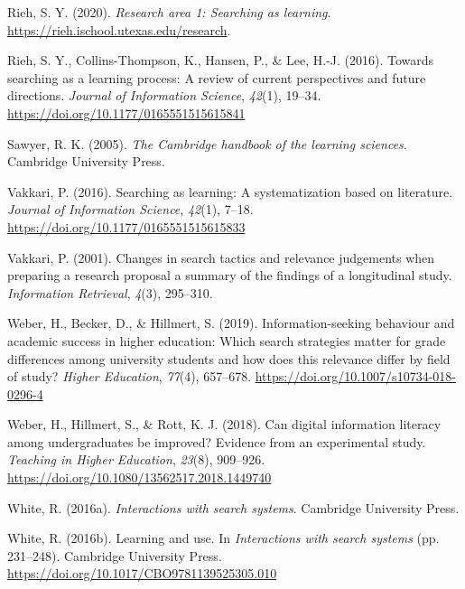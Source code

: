 \documentclass[a4paper, nobind]{templates/ociamthesis}
\newlength{\cslhangindent}
\newenvironment{CSLReferences}[2] %
 {%
  \setlength{\parindent}{0pt}
  \ifodd #1
  \let\oldpar\par
  \def\par{\hangindent=\cslhangindent\oldpar}
  \fi
  \setlength{\parskip}{1mm}
  \setlength{\baselineskip}{6mm}
 }%
 {}
\begin{document}
\begin{CSLReferences}{1}{0}
\leavevmode{}%
Rieh, S. Y. (2020). \emph{Research area 1: Searching as learning}. \url{https://rieh.ischool.utexas.edu/research}.

\leavevmode{}%
Rieh, S. Y., Collins-Thompson, K., Hansen, P., \& Lee, H.-J. (2016). Towards searching as a learning process: A review of current perspectives and future directions. \emph{Journal of Information Science}, \emph{42}(1), 19--34. \url{https://doi.org/10.1177/0165551515615841}

\leavevmode{}%
Sawyer, R. K. (2005). \emph{The {Cambridge} handbook of the learning sciences}. {Cambridge University Press}.

\leavevmode{}%
Vakkari, P. (2016). Searching as learning: A systematization based on literature. \emph{Journal of Information Science}, \emph{42}(1), 7--18. \url{https://doi.org/10.1177/0165551515615833}

\leavevmode{}%
Vakkari, P. (2001). Changes in search tactics and relevance judgements when preparing a research proposal a summary of the findings of a longitudinal study. \emph{Information Retrieval}, \emph{4}(3), 295--310.

\leavevmode{}%
Weber, H., Becker, D., \& Hillmert, S. (2019). Information-seeking behaviour and academic success in higher education: Which search strategies matter for grade differences among university students and how does this relevance differ by field of study? \emph{Higher Education}, \emph{77}(4), 657--678. \url{https://doi.org/10.1007/s10734-018-0296-4}

\leavevmode{}%
Weber, H., Hillmert, S., \& Rott, K. J. (2018). Can digital information literacy among undergraduates be improved? Evidence from an experimental study. \emph{Teaching in Higher Education}, \emph{23}(8), 909--926. \url{https://doi.org/10.1080/13562517.2018.1449740}

\leavevmode{}%
White, R. (2016a). \emph{Interactions with search systems}. Cambridge University Press.

\leavevmode{}%
White, R. (2016b). Learning and use. In \emph{Interactions with search systems} (pp. 231--248). {Cambridge University Press}. \url{https://doi.org/10.1017/CBO9781139525305.010}


\end{CSLReferences}
\end{document}
